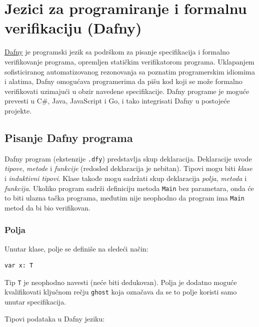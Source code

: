 \section{Jezici za programiranje i formalnu verifikaciju (Dafny)}\label{jezici-za-programiranje-i-formalnu-verifikaciju-dafny}

\href{https://dafny.org/}{Dafny} je programski jezik sa podrškom za pisanje specifikacija i formalno verifikovanje programa, opremljen statičkim verifikatorom programa. Uklapanjem sofisticiranog automatizovanog rezonovanja sa poznatim programerskim idiomima i alatima, Dafny omogućava programerima da pišu kod koji se može formalno verifikovati uzimajući u obzir navedene specifikacije. Dafny programe je moguće prevesti u C\#, Java, JavaScript i Go, i tako integrisati Dafny u postojeće projekte.

\subsection{Pisanje Dafny programa}\label{pisanje-dafny-programa}

Dafny program (ekstenzije \texttt{.dfy}) predstavlja skup deklaracija. Deklaracije uvode \emph{tipove}, \emph{metode} i \emph{funkcije} (redosled deklaracija je nebitan). Tipovi mogu biti \emph{klase} i \emph{induktivni tipovi}. Klase takođe mogu sadržati skup deklaracija \emph{polja}, \emph{metoda} i \emph{funkcija}. Ukoliko program sadrži definiciju metoda \texttt{Main} bez parametara, onda će to biti ulazna tačka programa, međutim nije neophodno da program ima \texttt{Main} metod da bi bio verifikovan.

\subsubsection{Polja}\label{polja}

Unutar klase, polje se definiše na sledeći način:

\begin{verbatim}
var x: T
\end{verbatim}

Tip \texttt{T} je neophodno navesti (neće biti dedukovan). Polja je dodatno moguće kvalifikovati ključnom rečju \texttt{ghost} koja označava da se to polje koristi samo unutar specifikacija.

Tipovi podataka u Dafny jeziku:

